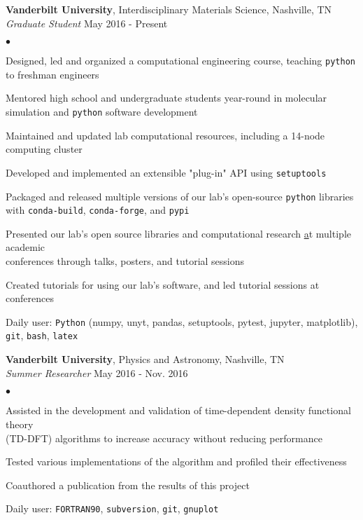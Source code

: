 \documentclass[margin, line]{res}
\newenvironment{list2}{
	\begin{list}{$\bullet$}{%
		\setlength{\itemsep}{0in}
		\setlength{\parsep}{0in} \setlength{\parskip}{0in}
		\setlength{\topsep}{0in} \setlength{\partopsep}{0in}
		\setlength{\leftmargin}{0.2in}}}{\end{list}}
\begin{document}
\begin{resume}
{\bf {Vanderbilt University}}, Interdisciplinary Materials Science, Nashville, TN \\
\vspace{-.3cm}
{\em Graduate Student}
    \hfill{May 2016 - Present}\\

\begin{list2}
\item Designed, led and organized a computational engineering course, teaching \verb|python| to freshman engineers
\item Mentored high school and undergraduate students year-round in molecular simulation and \verb|python| software development
\item Maintained and updated lab computational resources, including a 14-node computing cluster
\item Developed and implemented an extensible "plug-in" API using \verb|setuptools|
\item Packaged and released multiple versions of our lab's open-source \verb|python| libraries with \verb|conda-build|, \verb|conda-forge|, and \verb|pypi|
\item Presented our lab's open source libraries and computational research \href{mosdef.org} at multiple academic \\conferences through talks, posters, and tutorial sessions
\item Created tutorials for using our lab's software, and led tutorial sessions at conferences
\item Daily user: \verb|Python| (numpy, unyt, pandas, setuptools, pytest, jupyter, matplotlib), \verb|git|, \verb|bash|, \verb|latex| 
\end{list2}

{\bf {Vanderbilt University}}, Physics and Astronomy, Nashville, TN \\
\vspace{-.3cm}
{\em Summer Researcher}
	\hfill{May 2016 - Nov. 2016}\\

\begin{list2}
\item Assisted in the development and validation of time-dependent density functional theory \\(TD-DFT) algorithms to increase accuracy without reducing performance
\item Tested various implementations of the algorithm and profiled their effectiveness
\item Coauthored a publication from the results of this project
\item Daily user: \verb|FORTRAN90|, \verb|subversion|, \verb|git|, \verb|gnuplot|
\end{list2}


\end{resume}
\end{document}
